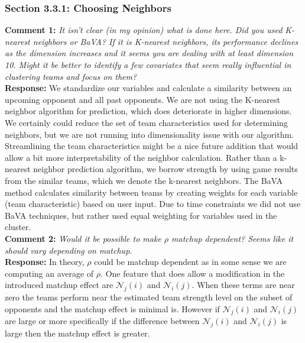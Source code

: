 \documentclass[11pt]{article} %
\begin{document}
\subsubsection*{Section 3.3.1: Choosing Neighbors}
{\bf Comment 1:} \emph{It isn't clear (in my opinion) what is done here. Did you used K-nearest neighbors or BaVA? If it is K-nearest neighbors, its performance declines as the dimension increases and it seems you are dealing with at least dimension 10. Might it be better to identify a few covariates that seem really influential in clustering teams and focus on them?\\}
{\bf Response:} We standardize our variables and calculate a similarity between an upcoming opponent and all past opponents. We are not using the K-nearest neighbor algorithm for prediction, which does deteriorate in higher dimensions. We certainly could reduce the set of team characteristics used for determining neighbors, but we are not running into dimensionality issue with our algorithm. Streamlining the team characteristics might be a nice future addition that would allow a bit more interpretability of the neighbor calculation. Rather than a k-nearest neighbor prediction algorithm, we  borrow strength by using game results from the similar teams, which we denote the k-nearest neighbors. The BaVA method calculates similarity between teams by creating weights for each variable (team characteristic) based on user input. Due to time constraints we did not use BaVA techniques, but rather used equal weighting for variables used in the cluster. 
\\
{\bf Comment 2:} \emph{Would it be possible to make $\rho$ matchup dependent? Seems like it should vary depending on matchup.\\}
{\bf Response:} In theory, $\rho$ could be matchup dependent as in some sense we are computing an average of $\rho.$ One feature that does allow a modification in the introduced matchup effect are $\mathcal{N}_j(i)$ and $\mathcal{N}_i(j).$ When these terms are near zero the teams perform near the estimated team strength level on the subset of opponents and the matchup effect is minimal is. However if $\mathcal{N}_j(i)$ and $\mathcal{N}_i(j)$ are large or more specifically if the difference between $\mathcal{N}_j(i)$ and $\mathcal{N}_i(j)$ is large then the matchup effect is greater.\\
\end{document}

